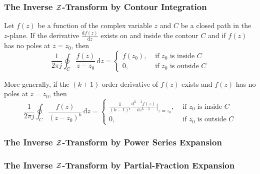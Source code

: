 \subsubsection{The Inverse \texorpdfstring{$\operatorname{\mathcal{Z}}$-Transform}{Z-Transform} by Contour Integration}\label{subsubsec:Inverse Z-Transform by Contour Integration}
\begin{definition}\label{def:Cauchy Integral Theorem}
  Let $f(z)$ be a function of the complex variable $z$ and $C$ be a closed path in the $z$-plane.
  If the derivative $\frac{\mathrm{d}f(z)}{\mathrm{d}z}$ exists on and inside the contour $C$ and if $f(z)$ has no poles at $z = z_{0}$, then
  \begin{equation}\label{eq:Cauchy Integral Theorem Specfic}
    \frac{1}{2 \pi j} \oint_{C} \frac{f(z)}{z-z_{0}} \, \mathrm{d}z = \begin{cases}
      f(z_{0}), & \text{ if $z_{0}$ is inside $C$} \\
      0, & \text{ if $z_{0}$ is outside $C$}
    \end{cases}
  \end{equation}

  More generally, if the $(k+1)$-order derivative of $f(z)$ exists and $f(z)$ has no poles at $z = z_{0}$, then
  \begin{equation}\label{eq:Cauchy Integral THeorem General}
    \frac{1}{2 \pi j} \oint_{C} \frac{f(z)}{\left( z-z_{0} \right)^{k}} \, \mathrm{d}z = \begin{cases}
      \frac{1}{\left( k-1 \right)!} \frac{\mathrm{d}^{k-1}f(z)}{\mathrm{d}z^{k-1}} \bigg \vert_{z=z_{0}}, & \text{ if $z_{0}$ is inside $C$} \\
      0, & \text{ if $z_{0}$ is outside $C$}
    \end{cases}
  \end{equation}
\end{definition}


\subsubsection{The Inverse \texorpdfstring{$\operatorname{\mathcal{Z}}$-Transform}{Z-Transform} by Power Series Expansion}\label{subsubsec:Inverse Z-Transform by Power Series Expansion}
\subsubsection{The Inverse \texorpdfstring{$\operatorname{\mathcal{Z}}$-Transform}{Z-Transform} by Partial-Fraction Expansion}\label{subsubsec:Inverse Z-Transform by Partial-Fraction Expansion}
